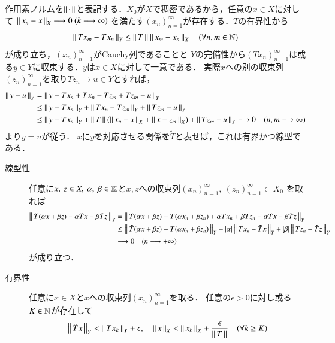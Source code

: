 \begin{prf}
		作用素ノルムを$\left\|\, \cdot\, \right\|_{}$と表記する．$X_0$が$X$で稠密であるから，任意の$x \in X$に対して
		$\left\|\, x_n - x\, \right\|_{X} \longrightarrow 0\ (k \longrightarrow \infty)$
		を満たす$(x_n)_{n=1}^{\infty}$が存在する．$T$の有界性から
		\begin{align}
			\left\|\, Tx_m - Tx_n\, \right\|_{Y} \leq \left\|\, T\, \right\|_{} \left\|\, x_m - x_n\, \right\|_{X}
			\quad (\forall n,m \in \mathbb{N})
		\end{align}
		が成り立ち，$(x_n)_{n=1}^{\infty}$がCauchy列であることと
		$Y$の完備性から$(Tx_n)_{n=1}^{\infty}$は或る$y \in Y$に収束する．$y$は$x \in X$に対して一意である．
		実際$x$への別の収束列$(z_n)_{n=1}^{\infty}$を取り$Tz_n \longrightarrow u \in Y$とすれば，
		\begin{align}
			\left\|\, y - u\, \right\|_{Y} &= \left\|\, y - Tx_n + Tx_n - Tz_m + Tz_m - u\, \right\|_{Y} \\
			&\leq \left\|\, y - Tx_n\, \right\|_{Y} + \left\|\, Tx_n - Tz_m\, \right\|_{Y} + \left\|\, Tz_m - u\, \right\|_{Y} \\
			&\leq \left\|\, y - Tx_n\, \right\|_{Y} + \left\|\, T\, \right\|_{}\left(\left\|\, x_n - x\, \right\|_{X} + \left\|\, x - z_m\, \right\|_{X}\right)+ \left\|\, Tz_m - u\, \right\|_{Y}
			\longrightarrow 0 \quad (n,m \longrightarrow \infty)
		\end{align}
		より$y = u$が従う．
		$x$に$y$を対応させる関係を$\tilde{T}$と表せば，これは有界かつ線型である．
		\begin{description}
			\item[線型性]
				任意に$x,\ z \in X,\ \alpha,\ \beta \in \mathbb{K}$と$x,z$への収束列$(x_n)_{n=1}^{\infty},\ (z_n)_{n=1}^{\infty} \subset X_0$
				を取れば
				\begin{align}
					\left\|\, \tilde{T}(\alpha x + \beta z) - \alpha \tilde{T}x - \beta \tilde{T}z\, \right\|_{Y}
					&= \left\|\, \tilde{T}(\alpha x + \beta z) - T(\alpha x_n + \beta z_n) + \alpha Tx_n + \beta Tz_n - \alpha \tilde{T}x - \beta \tilde{T}z\, \right\|_{Y} \\
					&\leq \left\|\, \tilde{T}(\alpha x + \beta z) - T(\alpha x_n + \beta z_n)\, \right\|_{Y}
						+ |\alpha| \left\|\, Tx_n - \tilde{T}x\, \right\|_{Y} + |\beta| \left\|\, Tz_n - \tilde{T}z\, \right\|_{Y} \\
					&\longrightarrow 0\quad (n \longrightarrow +\infty)
				\end{align}
				が成り立つ．
			\item[有界性] 任意に$x \in X$と$x$への収束列$(x_n)_{n=1}^{\infty}$を取る．
				任意の$\epsilon > 0$に対し或る$K \in \mathbb{N}$が存在して
				\begin{align}
					\Norm{\tilde{T}x}{Y} < \Norm{Tx_k}{Y} + \epsilon, \quad \Norm{x}{X} < \Norm{x_k}{X} + \frac{\epsilon}{\Norm{T}{}}
					\quad (\forall k \geq K)

\end{align}
\end{description}
\end{prf}
